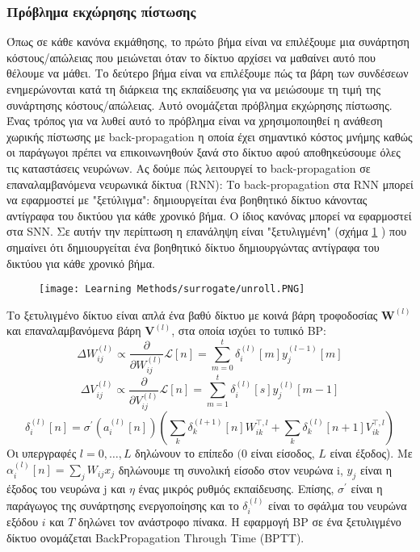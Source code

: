 \documentclass[12pt]{report}
\begin{document}
\subsubsection{Πρόβλημα εκχώρησης πίστωσης}
Όπως σε κάθε κανόνα εκμάθησης, το πρώτο βήμα είναι να επιλέξουμε μια συνάρτηση κόστους/απώλειας που μειώνεται όταν το δίκτυο αρχίσει να μαθαίνει αυτό που θέλουμε να μάθει. Το δεύτερο βήμα είναι να επιλέξουμε πώς τα βάρη των συνδέσεων ενημερώνονται κατά τη διάρκεια της εκπαίδευσης για να μειώσουμε τη τιμή της συνάρτησης κόστους/απώλειας. Αυτό ονομάζεται πρόβλημα εκχώρησης πίστωσης. Ένας τρόπος για να λυθεί αυτό το πρόβλημα είναι να χρησιμοποιηθεί η ανάθεση χωρικής πίστωσης με \textlatin{back-propagation} η οποία έχει σημαντικό κόστος μνήμης καθώς οι παράγωγοι πρέπει να επικοινωνηθούν ξανά στο δίκτυο αφού αποθηκεύσουμε όλες τις καταστάσεις νευρώνων. Ας δούμε πώς λειτουργεί το \textlatin{back-propagation} σε επαναλαμβανόμενα νευρωνικά δίκτυα (\textlatin{RNN}):
Το \textlatin{back-propagation} στα \textlatin{RNN} μπορεί να εφαρμοστεί με "ξετύλιγμα": δημιουργείται ένα βοηθητικό δίκτυο κάνοντας αντίγραφα του δικτύου για κάθε χρονικό βήμα. Ο ίδιος κανόνας μπορεί να εφαρμοστεί στα \textlatin{SNN}. Σε αυτήν την περίπτωση η επανάληψη είναι "ξετυλιγμένη" (σχήμα \ref{fig:unroll} ) που σημαίνει ότι δημιουργείται ένα βοηθητικό δίκτυο δημιουργώντας αντίγραφα του δικτύου για κάθε χρονικό βήμα.
\begin{figure}[htp]
    \centering
    \texttt{[image: Learning Methods/surrogate/unroll.PNG]}
    \caption{}
    \label{fig:unroll}
\end{figure}


Το ξετυλιγμένο δίκτυο είναι απλά ένα βαθύ δίκτυο με κοινά βάρη τροφοδοσίας $\mathbf{W}^{(l)}$ και επαναλαμβανόμενα βάρη $\mathbf{V}^{(l)}$, στα οποία ισχύει το τυπικό \textlatin{BP}:
\begin{equation}
\Delta W_{i j}^{(l)} \propto \frac{\partial}{\partial W_{i j}^{(l)}} \mathcal{L}[n]=\sum_{m=0}^{t} \delta_{i}^{(l)}[m] y_{j}^{(l-1)}[m]
\end{equation}
\begin{equation}
\Delta V_{i j}^{(l)} \propto \frac{\partial}{\partial V_{i j}^{(l)}} \mathcal{L}[n]=\sum_{m=1}^{t} \delta_{i}^{(l)}[s] y_{j}^{(l)}[m-1]
\end{equation}
\begin{equation}
\delta_{i}^{(l)}[n]=\sigma^{\prime}\left(a_{i}^{(l)}[n]\right)\left(\sum_{k} \delta_{k}^{(l+1)}[n] W_{i k}^{\top, l}+\sum_{k} \delta_{k}^{(l)}[n+1] V_{i k}^{\top, l}\right)
\end{equation}
Οι υπεργραφές $l=0, \ldots, L$ δηλώνουν το επίπεδο $(0$ είναι είσοδος, $L$ είναι έξοδος). Με $\alpha_{i}^{(l)}[n]=\sum_{j} W_{i j} x_{j}$ δηλώνουμε τη συνολική είσοδο στον νευρώνα \textlatin{i}, $y_{j}$ είναι η έξοδος του νευρώνα \textlatin{j} και $\eta$ ένας μικρός ρυθμός εκπαίδευσης. Επίσης, $\sigma^{\prime}$ είναι η παράγωγος της συνάρτησης ενεργοποίησης και το $\delta_{i}^{(l)}$ είναι το σφάλμα του νευρώνα εξόδου $i$ και $T$ δηλώνει τον ανάστροφο πίνακα. Η εφαρμογή BP σε ένα ξετυλιγμένο δίκτυο ονομάζεται \textlatin{BackPropagation Through Time} (\textlatin{BPTT}).
\end{document}
